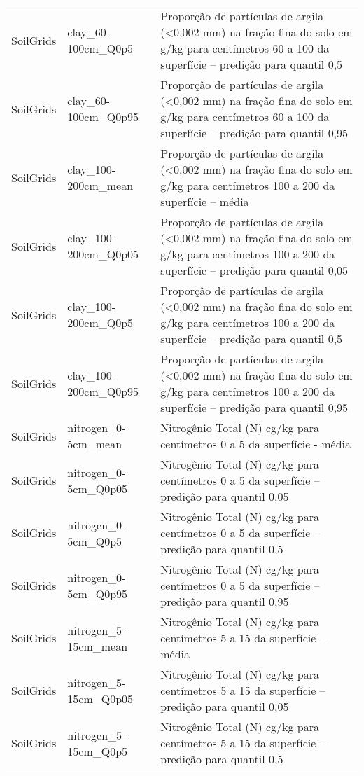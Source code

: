 \begin{longtable}{@{} p{4cm} p{4cm} p{8cm} @{}}
	SoilGrids &
	clay\_60-100cm\_Q0p5 &
	Proporção de partículas de argila (\textless 0,002 mm) na fração fina do solo em g/kg para centímetros 60 a 100 da superfície – predição para quantil 0,5 \\
	SoilGrids &
	clay\_60-100cm\_Q0p95 &
	Proporção de partículas de argila (\textless 0,002 mm) na fração fina do solo em g/kg para centímetros 60 a 100 da superfície – predição para quantil 0,95 \\
	SoilGrids &
	clay\_100-200cm\_mean &
	Proporção de partículas de argila (\textless 0,002 mm) na fração fina do solo em g/kg para centímetros 100 a 200 da superfície – média \\
	SoilGrids &
	clay\_100-200cm\_Q0p05 &
	Proporção de partículas de argila (\textless 0,002 mm) na fração fina do solo em g/kg para centímetros 100 a 200 da superfície – predição para quantil 0,05 \\
	SoilGrids &
	clay\_100-200cm\_Q0p5 &
	Proporção de partículas de argila (\textless 0,002 mm) na fração fina do solo em g/kg para centímetros 100 a 200 da superfície – predição para quantil 0,5 \\
	SoilGrids &
	clay\_100-200cm\_Q0p95 &
	Proporção de partículas de argila (\textless 0,002 mm) na fração fina do solo em g/kg para centímetros 100 a 200 da superfície – predição para quantil 0,95 \\
	SoilGrids &
	nitrogen\_0-5cm\_mean &
	Nitrogênio Total (N) cg/kg  para centímetros 0 a 5 da superfície - média \\
	SoilGrids &
	nitrogen\_0-5cm\_Q0p05 &
	Nitrogênio Total (N) cg/kg  para centímetros 0 a 5 da superfície – predição para quantil 0,05 \\
	SoilGrids &
	nitrogen\_0-5cm\_Q0p5 &
	Nitrogênio Total (N) cg/kg  para centímetros 0 a 5 da superfície – predição para quantil 0,5 \\
	SoilGrids &
	nitrogen\_0-5cm\_Q0p95 &
	Nitrogênio Total (N) cg/kg  para centímetros 0 a 5 da superfície – predição para quantil 0,95 \\
	SoilGrids &
	nitrogen\_5-15cm\_mean &
	Nitrogênio Total (N) cg/kg  para centímetros 5 a 15 da superfície – média \\
	SoilGrids &
	nitrogen\_5-15cm\_Q0p05 &
	Nitrogênio Total (N) cg/kg  para centímetros 5 a 15 da superfície – predição para quantil 0,05 \\
	SoilGrids &
	nitrogen\_5-15cm\_Q0p5 &
	Nitrogênio Total (N) cg/kg  para centímetros 5 a 15 da superfície – predição para quantil 0,5 \\

\end{longtable}
